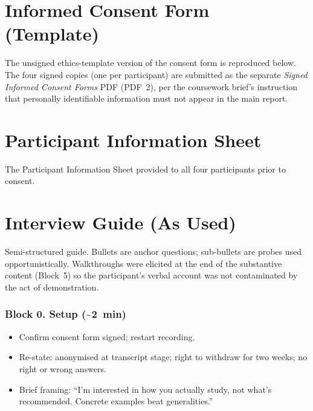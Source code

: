 \documentclass[a4paper,11pt]{article}
\begin{document}
\newpage
\section{Informed Consent Form (Template)}\label{app:consent}
The unsigned ethics-template version of the consent form is reproduced
below. The four signed copies (one per participant) are submitted as
the separate \emph{Signed Informed Consent Forms} PDF (PDF~2), per
the coursework brief's instruction that personally identifiable
information must not appear in the main report.


\newpage
\section{Participant Information Sheet}\label{app:pis}
The Participant Information Sheet provided to all four participants
prior to consent.


\newpage
\section{Interview Guide (As Used)}\label{app:guide}

Semi-structured guide. Bullets are anchor questions; sub-bullets are
probes used opportunistically. Walkthroughs were elicited at the end
of the substantive content (Block~5) so the participant's verbal
account was not contaminated by the act of demonstration.

\subsubsection*{Block 0. Setup (\textasciitilde2~min)}
\begin{itemize}[leftmargin=1.2em,itemsep=2pt]
    \item Confirm consent form signed; restart recording.
    \item Re-state: anonymised at transcript stage; right to withdraw
          for two weeks; no right or wrong answers.
    \item Brief framing: ``I'm interested in how you actually study,
          not what's recommended. Concrete examples beat generalities.''
\end{itemize}
\end{document}
